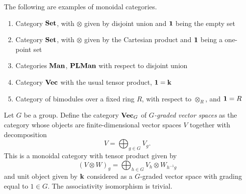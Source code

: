 \begin{example}
The following are examples of monoidal categories.

  \begin{enumerate}
    \item Category $\mathbf{Set}$, with $\otimes$ given by disjoint union and
      $\mathbf{1}$ being the empty set
    \item Category $\mathbf{Set}$, with $\otimes$ given by the Cartesian product
      and $\mathbf{1}$ being a one-point set
    \item Categories $\mathbf{Man}$, $\mathbf{PLMan}$ with respect to disjoint union
    \item Category $\mathbf{Vec}$ with the usual tensor product, $\mathbf{1} = \mathbf{k}$
    \item Category of bimodules over a fixed ring $R$, with respect
      to $\otimes_R$, and $\mathbf{1} = R$

  \end{enumerate}

\end{example}


\begin{example}\label{x:vecg}
  Let $G$ be a group. Define the category $\mathbf{Vec}_G$ of \emph{$G$-graded vector
  spaces} as the category
  whose objects are finite-dimensional vector spaces $V$ together with
  decomposition
  $$
    V=\bigoplus_{g\in G} V_g.
  $$
  This is a monoidal category with tensor product given by
  $$
    (V\otimes W)_g = \bigoplus_{h\in G} V_h \otimes W_{h^{-1}g}
  $$
  and unit object given by $\mathbf{k}$ considered as a $G$-graded vector space with
  grading equal to $1\in G$. The associativity isomorphism is trivial.
\end{example}




